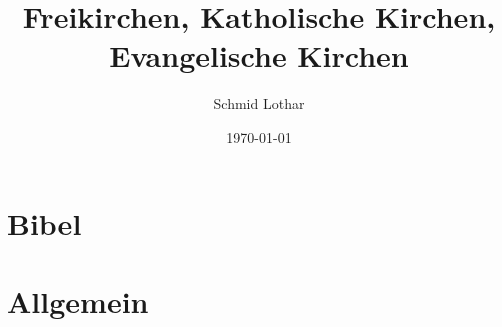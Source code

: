 \documentclass[a4paper, 12pt]{article}
\title{Freikirchen, Katholische Kirchen, Evangelische Kirchen}
\author{Schmid Lothar}
\date{\today}
\begin{document}
\maketitle[-1]

\part{Bibel}

\part{Allgemein}

\end{document}
